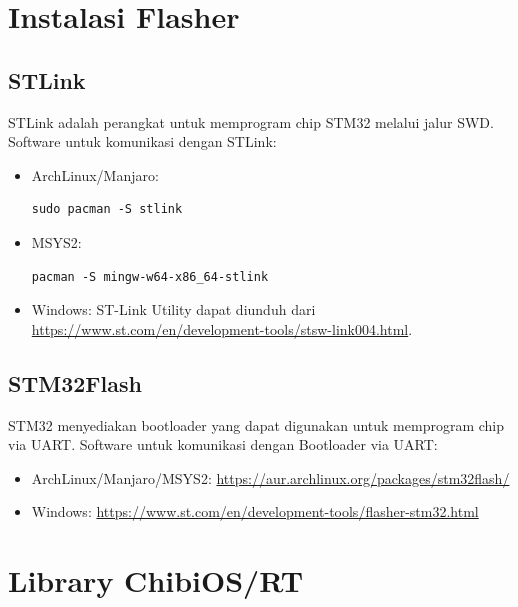 \documentclass[12pt]{book}
\begin{document}
	\section{Instalasi Flasher}
	
	\subsection{STLink}
	
	STLink adalah perangkat untuk memprogram chip STM32 melalui jalur SWD.	
	Software untuk komunikasi dengan STLink:
	
	\begin{itemize}
		\item ArchLinux/Manjaro:
		\begin{verbatim}
sudo pacman -S stlink
		\end{verbatim}
		
		\item MSYS2:
		\begin{verbatim}
pacman -S mingw-w64-x86_64-stlink
		\end{verbatim}
		
		\item Windows: ST-Link Utility dapat diunduh dari \url{https://www.st.com/en/development-tools/stsw-link004.html}.
	\end{itemize}
	
	\subsection{STM32Flash}
	
	STM32 menyediakan bootloader yang dapat digunakan untuk memprogram chip via UART.
	Software untuk komunikasi dengan Bootloader via UART:
	
	\begin{itemize}
		\item ArchLinux/Manjaro/MSYS2: \url{https://aur.archlinux.org/packages/stm32flash/}
		
		\item Windows: \url{https://www.st.com/en/development-tools/flasher-stm32.html}
	\end{itemize}
	
	\newpage
	\section{Library ChibiOS/RT}
	
\end{document}
